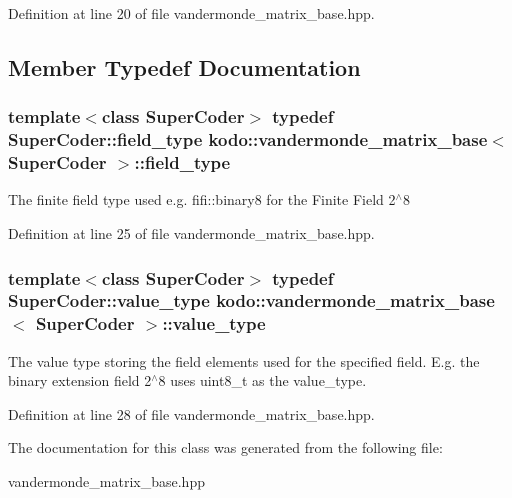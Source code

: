 Definition at line 20 of file vandermonde\-\_\-matrix\-\_\-base.\-hpp.



\subsection{Member Typedef Documentation}
\hypertarget{classkodo_1_1vandermonde__matrix__base_a347bf0cce48328699ba6152ab90457fe}{
\subsubsection[{field\-\_\-type}]{\setlength{\rightskip}{0pt plus 5cm}template$<$class Super\-Coder$>$ typedef Super\-Coder\-::field\-\_\-type {\bf kodo\-::vandermonde\-\_\-matrix\-\_\-base}$<$ Super\-Coder $>$\-::{\bf field\-\_\-type}}}\label{classkodo_1_1vandermonde__matrix__base_a347bf0cce48328699ba6152ab90457fe}




The finite field type used e.\-g. fifi\-::binary8 for the Finite Field 2$^\wedge$8 

Definition at line 25 of file vandermonde\-\_\-matrix\-\_\-base.\-hpp.

\hypertarget{classkodo_1_1vandermonde__matrix__base_a46b460b3cca168d1d54b88a0071a9822}{
\subsubsection[{value\-\_\-type}]{\setlength{\rightskip}{0pt plus 5cm}template$<$class Super\-Coder$>$ typedef Super\-Coder\-::value\-\_\-type {\bf kodo\-::vandermonde\-\_\-matrix\-\_\-base}$<$ Super\-Coder $>$\-::{\bf value\-\_\-type}}}\label{classkodo_1_1vandermonde__matrix__base_a46b460b3cca168d1d54b88a0071a9822}




The value type storing the field elements used for the specified field. E.\-g. the binary extension field 2$^\wedge$8 uses uint8\-\_\-t as the value\-\_\-type. 

Definition at line 28 of file vandermonde\-\_\-matrix\-\_\-base.\-hpp.



The documentation for this class was generated from the following file\-:\begin{DoxyCompactItemize}
\item 
vandermonde\-\_\-matrix\-\_\-base.\-hpp\end{DoxyCompactItemize}
